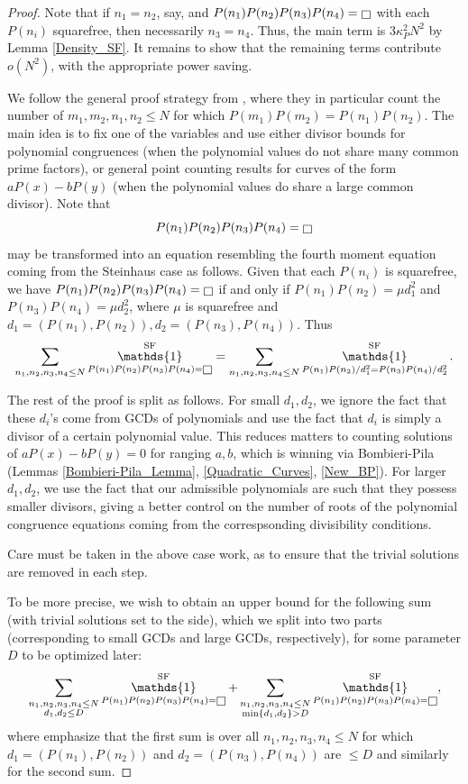 \documentclass[11pts]{amsart}
\numberwithin{equation}{section}
\DeclareMathOperator{\one}{\mathds{1}}
\let\oldsquare\square
\renewcommand{\square}[1][-1pt]{%
 {\raisebox{#1}{$\oldsquare$}}%
}
\begin{document}
\begin{proof}
Note that if $n_1=n_2$, say, and $P(n_1)P(n_2)P(n_3)P(n_4)=\square$ with each $P(n_i)$ squarefree, then necessarily $n_3=n_4$. Thus, the main term is $3\kappa_P^2N^2$ by Lemma \ref{Density_SF}. It remains to show that the remaining terms contribute $o(N^2)$, with the appropriate power saving. 

We follow the general proof strategy from \cite{Wang-Xu}, where they in particular count the number of $m_1,m_2,n_1,n_2\leq N$ for which $P(m_1)P(m_2)=P(n_1)P(n_2)$. The main idea is to fix one of the variables and use either divisor bounds for polynomial congruences (when the polynomial values do not share many common prime factors), or general point counting results for curves of the form $aP(x)-bP(y)$ (when the polynomial values do share a large common divisor). Note that 
\[
    P(n_1)P(n_2)P(n_3)P(n_4)=\square
\]
may be transformed into an equation resembling the fourth moment equation coming from the Steinhaus case as follows. Given that each $P(n_i)$ is squarefree, 
we have $P(n_1)P(n_2)P(n_3)P(n_4)=\square$ if and only if $P(n_1)P(n_2)=\mu d_1^2$ and $P(n_3)P(n_4)=\mu d_2^2$, where $\mu$ is squarefree and $d_1=(P(n_1),P(n_2)),d_2=(P(n_3),P(n_4)).$ Thus
\[
 \sum_{n_1,n_2,n_3,n_4\leq N}\one_{P(n_1)P(n_2)P(n_3)P(n_4)=\square}^{\text{SF}}
 =
  \sum_{n_1,n_2,n_3,n_4\leq N}\one_{P(n_1)P(n_2)/d_1^2=P(n_3)P(n_4)/d_2^2}^{\text{SF}}.
\]

The rest of the proof is split as follows. For small $d_1,d_2$, we ignore the fact that these $d_i$'s come from GCDs of polynomials and use the fact that $d_i$ is simply a divisor of a certain polynomial value. This reduces matters to counting solutions of $aP(x)-bP(y)=0$ for ranging $a,b$, which is winning via Bombieri-Pila (Lemmas \ref{Bombieri-Pila_Lemma}, \ref{Quadratic_Curves}, \ref{New_BP}). For larger $d_1,d_2$, we use the fact that our admissible polynomials are such that they possess smaller divisors, giving a better control on the number of roots of the polynomial congruence equations coming from the correspsonding divisibility conditions. 

Care must be taken in the above case work, as to ensure that the trivial solutions are removed in each step.

To be more precise, we wish to obtain an upper bound for the following sum (with trivial solutions set to the side), which we split into two parts (corresponding to small GCDs and large GCDs, respectively), for some parameter $D$ to be optimized later:
    \begin{align}
    \label{off-diagonal sum}
         \sum_{\substack{{n_1,n_2,n_3,n_4\leq N}\\{d_1,d_2\leq D}}}\one_{P(n_1)P(n_2)P(n_3)P(n_4)=\square}^{\text{SF}}
         +
         \sum_{\substack{{n_1,n_2,n_3,n_4\leq N}\\{\min\{d_1,d_2\}>D}}}\one_{P(n_1)P(n_2)P(n_3)P(n_4)=\square}^{\text{SF}},
    \end{align}
    where emphasize that the first sum is over all $n_1,n_2,n_3,n_4\leq N$ for which $d_1=(P(n_1),P(n_2))$ and $d_2=(P(n_3),P(n_4))$ are $\leq D$ and similarly for the second sum.



\end{proof}
\end{document}
